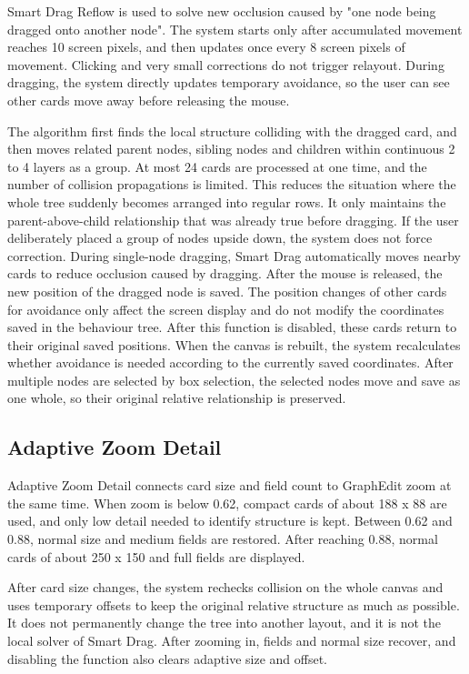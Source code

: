 Smart Drag Reflow is used to solve new occlusion caused by "one node being dragged onto another node". The system starts only after accumulated movement reaches 10 screen pixels, and then updates once every 8 screen pixels of movement. Clicking and very small corrections do not trigger relayout. During dragging, the system directly updates temporary avoidance, so the user can see other cards move away before releasing the mouse.

The algorithm first finds the local structure colliding with the dragged card, and then moves related parent nodes, sibling nodes and children within continuous 2 to 4 layers as a group. At most 24 cards are processed at one time, and the number of collision propagations is limited. This reduces the situation where the whole tree suddenly becomes arranged into regular rows. It only maintains the parent-above-child relationship that was already true before dragging. If the user deliberately placed a group of nodes upside down, the system does not force correction. During single-node dragging, Smart Drag automatically moves nearby cards to reduce occlusion caused by dragging. After the mouse is released, the new position of the dragged node is saved. The position changes of other cards for avoidance only affect the screen display and do not modify the coordinates saved in the behaviour tree. After this function is disabled, these cards return to their original saved positions. When the canvas is rebuilt, the system recalculates whether avoidance is needed according to the currently saved coordinates. After multiple nodes are selected by box selection, the selected nodes move and save as one whole, so their original relative relationship is preserved.

\subsection{Adaptive Zoom Detail}

Adaptive Zoom Detail connects card size and field count to GraphEdit zoom at the same time. When zoom is below 0.62, compact cards of about 188 x 88 are used, and only low detail needed to identify structure is kept. Between 0.62 and 0.88, normal size and medium fields are restored. After reaching 0.88, normal cards of about 250 x 150 and full fields are displayed.

After card size changes, the system rechecks collision on the whole canvas and uses temporary offsets to keep the original relative structure as much as possible. It does not permanently change the tree into another layout, and it is not the local solver of Smart Drag. After zooming in, fields and normal size recover, and disabling the function also clears adaptive size and offset.

